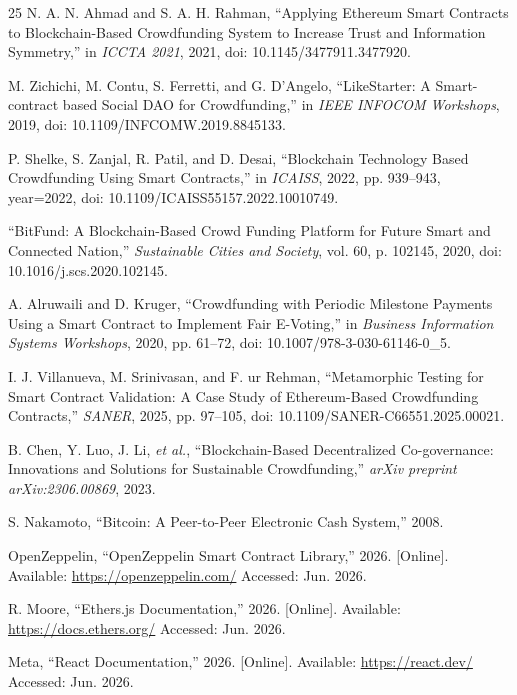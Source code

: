 \documentclass[12pt]{article}
\begin{document}
\begin{thebibliography}{25}
N. A. N. Ahmad and S. A. H. Rahman, ``Applying Ethereum Smart Contracts to Blockchain-Based Crowdfunding System to Increase Trust and Information Symmetry,'' in \textit{ICCTA 2021}, 2021, doi: 10.1145/3477911.3477920.

M. Zichichi, M. Contu, S. Ferretti, and G. D'Angelo, ``LikeStarter: A Smart-contract based Social DAO for Crowdfunding,'' in \textit{IEEE INFOCOM Workshops}, 2019, doi: 10.1109/INFCOMW.2019.8845133.

P. Shelke, S. Zanjal, R. Patil, and D. Desai, ``Blockchain Technology Based Crowdfunding Using Smart Contracts,'' in \textit{ICAISS}, 2022, pp. 939--943, year={2022}, doi: 10.1109/ICAISS55157.2022.10010749.

``BitFund: A Blockchain-Based Crowd Funding Platform for Future Smart and Connected Nation,'' \textit{Sustainable Cities and Society}, vol. 60, p. 102145, 2020, doi: 10.1016/j.scs.2020.102145.

A. Alruwaili and D. Kruger, ``Crowdfunding with Periodic Milestone Payments Using a Smart Contract to Implement Fair E-Voting,'' in \textit{Business Information Systems Workshops}, 2020, pp. 61--72, doi: 10.1007/978-3-030-61146-0\_5.

I. J. Villanueva, M. Srinivasan, and F. ur Rehman, ``Metamorphic Testing for Smart Contract Validation: A Case Study of Ethereum-Based Crowdfunding Contracts,'' \textit{SANER}, 2025, pp. 97--105, doi: 10.1109/SANER-C66551.2025.00021.

B. Chen, Y. Luo, J. Li, \textit{et al.}, ``Blockchain-Based Decentralized Co-governance: Innovations and Solutions for Sustainable Crowdfunding,'' \textit{arXiv preprint arXiv:2306.00869}, 2023.

S. Nakamoto, ``Bitcoin: A Peer-to-Peer Electronic Cash System,'' 2008.

OpenZeppelin, ``OpenZeppelin Smart Contract Library,'' 2026. [Online]. Available: \url{https://openzeppelin.com/} Accessed: Jun. 2026.

R. Moore, ``Ethers.js Documentation,'' 2026. [Online]. Available: \url{https://docs.ethers.org/} Accessed: Jun. 2026.

Meta, ``React Documentation,'' 2026. [Online]. Available: \url{https://react.dev/} Accessed: Jun. 2026.


\end{thebibliography}
\end{document}
